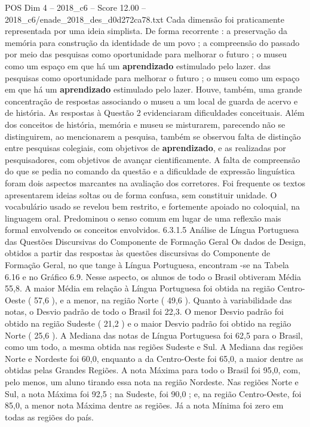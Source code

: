 \begin{textsample}{POS Dim 4 – 2018\_c6 – Score 12.00 – 2018\_c6/enade\_2018\_des\_d0d272ca78.txt}
Cada dimensão foi praticamente representada por uma ideia simplista.
De forma recorrente : a preservação da memória para construção da identidade de um povo ; a compreensão do passado por meio das pesquisas como oportunidade para melhorar o futuro ; o museu como um espaço em que há um \textbf{aprendizado} estimulado pelo lazer. das pesquisas como oportunidade para melhorar o futuro ; o museu como um espaço em que há um \textbf{aprendizado} estimulado pelo lazer.
Houve, também, uma grande concentração de respostas associando o museu a um local de guarda de acervo e de história.
As respostas à Questão 2 evidenciaram dificuldades conceituais.
Além dos conceitos de história, memória e museu se misturarem, parecendo não se distinguirem, ao mencionarem a pesquisa, também se observou falta de distinção entre pesquisas colegiais, com objetivos de \textbf{aprendizado}, e as realizadas por pesquisadores, com objetivos de avançar cientificamente.
A falta de compreensão do que se pedia no comando da questão e a dificuldade de expressão linguística foram dois aspectos marcantes na avaliação dos corretores.
Foi frequente os textos apresentarem ideias soltas ou de forma confusa, sem constituir unidade.
O vocabulário usado se revelou bem restrito, e fortemente apoiado no coloquial, na linguagem oral.
Predominou o senso comum em lugar de uma reflexão mais formal envolvendo os conceitos envolvidos. 6.3.1.5 Análise de Língua Portuguesa das Questões Discursivas do Componente de Formação Geral Os dados de Design, obtidos a partir das respostas às questões discursivas do Componente de Formação Geral, no que tange à Língua Portuguesa, encontram -se na Tabela 6.16 e no Gráfico 6.9.
Nesse aspecto, os alunos de todo o Brasil obtiveram Média 55,8.
A maior Média em relação à Língua Portuguesa foi obtida na região Centro-Oeste ( 57,6 ), e a menor, na região Norte ( 49,6 ).
Quanto à variabilidade das notas, o Desvio padrão de todo o Brasil foi 22,3.
O menor Desvio padrão foi obtido na região Sudeste ( 21,2 ) e o maior Desvio padrão foi obtido na região Norte ( 25,6 ).
A Mediana das notas de Língua Portuguesa foi 62,5 para o Brasil, como um todo, a mesma obtida nas regiões Sudeste e Sul.
A Mediana das regiões Norte e Nordeste foi 60,0, enquanto a da Centro-Oeste foi 65,0, a maior dentre as obtidas pelas Grandes Regiões.
A nota Máxima para todo o Brasil foi 95,0, com, pelo menos, um aluno tirando essa nota na região Nordeste.
Nas regiões Norte e Sul, a nota Máxima foi 92,5 ; na Sudeste, foi 90,0 ; e, na região Centro-Oeste, foi 85,0, a menor nota Máxima dentre as regiões.
Já a nota Mínima foi zero em todas as regiões do país.

\end{textsample}
